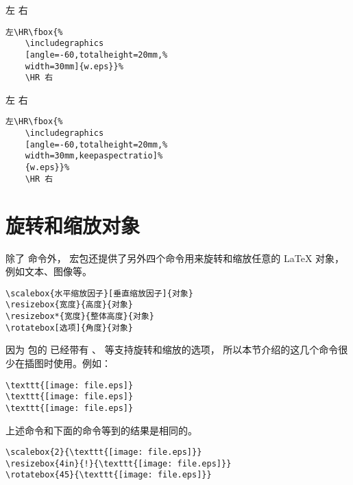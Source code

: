 \begin{minipage}[c]{.45\textwidth}
	左\HR\fbox{%
		\texttt{[image: w]}}%
	\HR 右
\end{minipage}%
\hspace{-.5cm}\begin{minipage}[c]{.5\textwidth}
	\begin{Verbatim}[frame=lines,label=\colorbox{green}{\small 例九},labelposition=topline]
	左\HR\fbox{%
	\includegraphics
	[angle=-60,totalheight=20mm,%
	width=30mm]{w.eps}}%
	\HR 右
	\end{Verbatim}
\end{minipage}

\begin{minipage}[c]{.45\textwidth}
	左\HR\fbox{%
		\texttt{[image: w]}}%
	\HR 右
\end{minipage}%
\hspace{-.5cm}\begin{minipage}[c]{.5\textwidth}
\begin{Verbatim}[frame=lines,label=\colorbox{green}{\small 例十},labelposition=topline]
	左\HR\fbox{%
	\includegraphics
	[angle=-60,totalheight=20mm,%
	width=30mm,keepaspectratio]%
	{w.eps}}%
	\HR 右
\end{Verbatim}
\end{minipage}

\section{旋转和缩放对象}\label{sec:scalerotate}
除了 命令外，
 宏包还提供了另外四个命令用来旋转和缩放任意的 \LaTeX{} 对象，例如文本、图像等。
\begin{lstlisting}
\scalebox{水平缩放因子}[垂直缩放因子]{对象}
\resizebox{宽度}{高度}{对象}
\resizebox*{宽度}{整体高度}{对象}
\rotatebox[选项]{角度}{对象}
\end{lstlisting}

因为  包的  已经带有 、 等支持旋转和缩放的选项，
所以本节介绍的这几个命令很少在插图时使用。例如：
\begin{lstlisting}
\texttt{[image: file.eps]}
\texttt{[image: file.eps]}
\texttt{[image: file.eps]}
\end{lstlisting}
上述命令和下面的命令等到的结果是相同的。
\begin{lstlisting}
\scalebox{2}{\texttt{[image: file.eps]}}
\resizebox{4in}{!}{\texttt{[image: file.eps]}}
\rotatebox{45}{\texttt{[image: file.eps]}}
\end{lstlisting}

